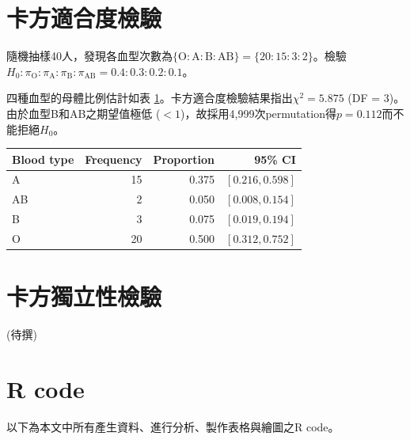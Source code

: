\documentclass[12pt, a4paper, onecolumn]{article}
\begin{document}
\section{卡方適合度檢驗}
隨機抽樣40人，發現各血型次數為$\{\text{O} : \text{A} : \text{B} : \text{AB}\} = \{20:15:3:2\}$。檢驗$H_0: \pi_{\mathrm{O}} : \pi_{\mathrm{A}} : \pi_{\mathrm{B}} : \pi_{\mathrm{AB}} = 0.4:0.3:0.2:0.1$。

四種血型的母體比例估計如表 \ref{table:chisq_goodness}。卡方適合度檢驗結果指出$\chi^2 = 5.875$ (DF = 3)。由於血型B和AB之期望值極低 ($<1$)，故採用4,999次permutation得$p = 0.112$而不能拒絕$H_0$。

\begin{table}[ht!]
	\centering
	\begin{tabular}{lrrr}
		\hline
		Blood type & Frequency & Proportion & 95\% CI \\ 
		\hline
		A & 15 & 0.375 & $\left[0.216, 0.598\right]$ \\ 
		AB & 2 & 0.050 & $\left[0.008, 0.154\right]$ \\ 
		B & 3 & 0.075 & $\left[0.019, 0.194\right]$ \\ 
		O & 20 & 0.500 & $\left[0.312, 0.752\right]$ \\ 
		\hline
	\end{tabular}
	\label{table:chisq_goodness}
\end{table}


\section{卡方獨立性檢驗}
(待撰)

\clearpage
\onecolumn
\appendix
\section{R code}
以下為本文中所有產生資料、進行分析、製作表格與繪圖之R code。
\end{document}
